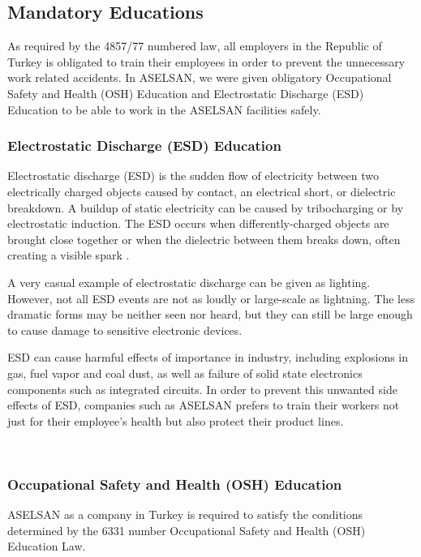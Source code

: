 \subsection{Mandatory Educations}
\- \indent
	As required by the 4857/77  numbered law, all employers in the Republic of Turkey is obligated to train their employees in order to prevent the unnecessary work related accidents. In ASELSAN, we were given obligatory Occupational Safety and Health (OSH) Education and Electrostatic Discharge (ESD) Education to be able to work in the ASELSAN facilities safely.
	
	
	
\subsubsection{Electrostatic Discharge (ESD) Education }
\- \indent
	Electrostatic discharge (ESD) is the sudden flow of electricity between two electrically charged objects caused by contact, an electrical short, or dielectric breakdown. A buildup of static electricity can be caused by tribocharging or by electrostatic induction. The ESD occurs when differently-charged objects are brought close together or when the dielectric between them breaks down, often creating a visible spark \cite{esd}.

	A very casual example of electrostatic discharge can be given as lighting. However, not all ESD events are not as loudly or large-scale as lightning. The less dramatic forms  may be neither seen nor heard, but they can still be large enough to cause damage to sensitive electronic devices. 

	ESD can cause harmful effects of importance in industry, including explosions in gas, fuel vapor and coal dust, as well as failure of solid state electronics components such as integrated circuits. In order to prevent this unwanted side effects of ESD, companies such as ASELSAN prefers to train their workers not just for their employee's health but also protect their product lines. 

\-\\

\subsubsection{Occupational Safety and Health (OSH) Education}
\- \indent
	ASELSAN as a company in Turkey is required to satisfy the conditions determined by the 6331 number Occupational Safety and Health (OSH) Education Law. 
	
